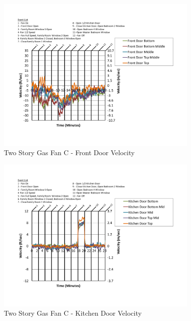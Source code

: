 \documentclass{article}
\begin{document}
\begin{appendices}
	\begin{figure}[H]
		\centering
		\includegraphics[height=3.05in,trim=0.67in 1.1in 0.67in 0.8in,clip=true]{0_Images/Results_Charts/ColdFlow/Two_Story/Gas/C/Front_Door_Velocity.pdf}
		\caption{Two Story Gas Fan C - Front Door Velocity}
	\end{figure}
 

	\begin{figure}[H]
		\centering
		\includegraphics[height=3.05in,trim=0.67in 1.1in 0.67in 0.8in,clip=true]{0_Images/Results_Charts/ColdFlow/Two_Story/Gas/C/Kitchen_Door_Velocity.pdf}
		\caption{Two Story Gas Fan C - Kitchen Door Velocity}
	\end{figure}
 
	\clearpage


\end{appendices}
\end{document}
